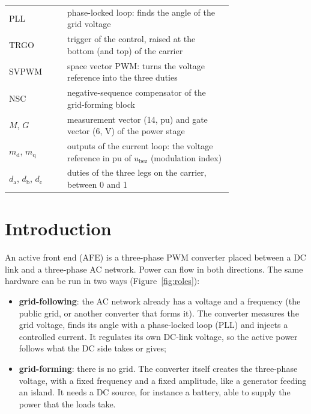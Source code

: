 \documentclass[11pt,a4paper]{scrartcl}
\newcommand{\ped}[1]{_{\mathrm{#1}}}
\begin{document}
\begin{onehalfspace}
\begin{longtable}{@{} l p{0.74\linewidth} @{}}
	PLL & phase-locked loop: finds the angle of the grid voltage \\
	TRGO & trigger of the control, raised at the bottom (and top) of the carrier \\
	SVPWM & space vector PWM: turns the voltage reference into the three duties \\
	NSC & negative-sequence compensator of the grid-forming block \\
	$M$, $G$ & measurement vector (14, pu) and gate vector (6, V) of the power stage \\
	$m\ped{d}$, $m\ped{q}$ & outputs of the current loop: the voltage reference in pu of $u\ped{bez}$ (modulation index) \\
	$d\ped{a}$, $d\ped{b}$, $d\ped{c}$ & duties of the three legs on the carrier, between 0 and 1 \\
\end{longtable}
\addtocounter{table}{-1}
\endgroup
\section{Introduction}
\label{sec:intro}

An active front end (AFE) is a three-phase PWM converter placed between a DC link and a three-phase AC network. Power can flow in both directions. The same hardware can be run in two ways (Figure~\ref{fig:roles}):

\begin{itemize}[nosep]
	\item \textbf{grid-following}: the AC network already has a voltage and a frequency (the public grid, or another converter that forms it). The converter measures the grid voltage, finds its angle with a phase-locked loop (PLL) and injects a controlled current. It regulates its own DC-link voltage, so the active power follows what the DC side takes or gives;
	\item \textbf{grid-forming}: there is no grid. The converter itself creates the three-phase voltage, with a fixed frequency and a fixed amplitude, like a generator feeding an island. It needs a DC source, for instance a battery, able to supply the power that the loads take.
\end{itemize}


\end{onehalfspace}
\end{document}
